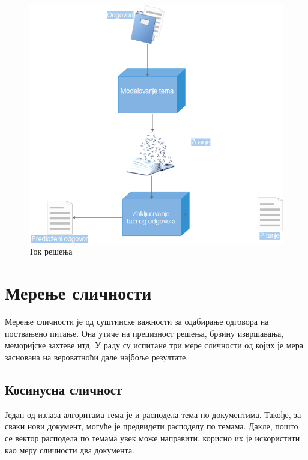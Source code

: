 \begin{figure}[H]
    \centering
   \includegraphics[scale=0.9]{./Slike/slika37.png} 
	\caption{Ток решења}
	\label{fig:slika1}
\end{figure}


\section{Мерење сличности}

Мерење сличности је од суштинске важности за одабирање одговора на поствањено питање. Она утиче на прецизност решења, брзину извршавања, меморијске захтеве итд. У раду су испитане три мере сличности од којих је мера заснована на вероватноћи дале најбоље резултате.



\subsection{Косинусна сличност}

Један од излаза алгоритама тема је и расподела тема по документима. Такође, за сваки нови документ, могуће је предвидети расподелу по темама. Дакле, пошто се вектор расподела по темама увек може направити, корисно их је искористити као меру сличности два документа.

